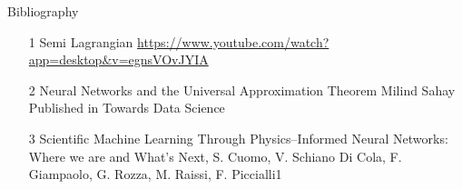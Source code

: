 \begin{frame}{Bibliography}

    \begin{itemize}
        \item[1] Semi Lagrangian \url{https://www.youtube.com/watch?app=desktop&v=egnsVOvJYIA}
        \item[2] Neural Networks and the Universal Approximation Theorem Milind Sahay Published in
        Towards Data Science
        \item[3] Scientific  Machine  Learning  Through  Physics–Informed  Neural Networks: Where we are and What’s Next,
        S. Cuomo, V. Schiano Di Cola, F. Giampaolo,  G. Rozza,  M. Raissi, F. Piccialli1
    \end{itemize}
    
\end{frame}